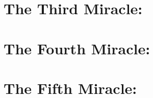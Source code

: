 \documentclass[11pt]{book} %
\begin{document}
\chapter{The Third Miracle: }


\chapter{The Fourth Miracle: }


\chapter{The Fifth Miracle: }
\end{document}
